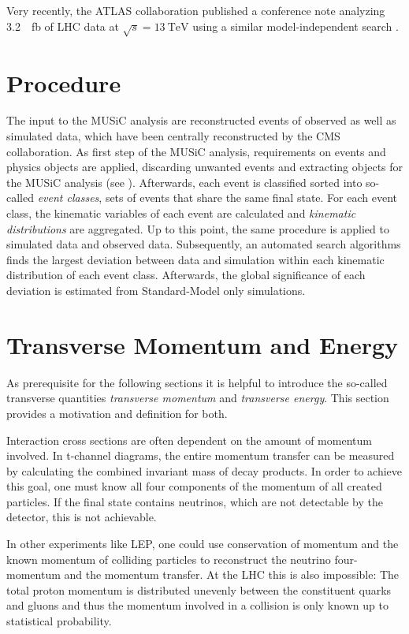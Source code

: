 Very recently, the \ac{ATLAS} collaboration published a conference note analyzing \SI{3.2}{\per\femto\barn} of \ac{LHC} data at $\sqrt{s} = \SI{13}{\TeV}$ using a similar model-independent search \cite{ATLAS:ATLAS-CONF-2017-001}. 

\section{Procedure}
The input to the \ac{MUSiC} analysis are reconstructed events of observed as well as simulated data, which have been centrally reconstructed by the \ac{CMS} collaboration.
As first step of the \ac{MUSiC} analysis, requirements on events and physics objects are applied, discarding unwanted events and extracting objects for the \ac{MUSiC} analysis (see ).
Afterwards, each event is classified sorted into so-called \emph{event classes}, sets of events that share the same final state.
For each event class, the kinematic variables of each event are calculated and \emph{kinematic distributions} are aggregated.
Up to this point, the same procedure is applied to simulated data and observed data.
Subsequently, an automated search algorithms finds the largest deviation between data and simulation within each kinematic distribution of each event class. Afterwards, the global significance of each deviation is estimated from Standard-Model only simulations.

\section{Transverse Momentum and Energy}
\label{sec:transverse_quantities}

As prerequisite for the following sections it is helpful to introduce the so-called transverse quantities \emph{transverse momentum} and \emph{transverse energy}. This section provides a motivation and definition for both.

Interaction cross sections are often dependent on the amount of momentum involved. In t-channel diagrams, the entire momentum transfer can be measured by calculating the combined invariant mass of decay products.
In order to achieve this goal, one must know all four components of the momentum of all created particles. If the final state contains neutrinos, which are not detectable by the detector, this is not achievable.

In other experiments like \ac{LEP}, one could use conservation of momentum and the known momentum of colliding particles to reconstruct the neutrino four-momentum and the momentum transfer. At the \ac{LHC} this is also impossible: The total proton momentum is distributed unevenly between the constituent quarks and gluons and thus the momentum involved in a collision is only known up to statistical probability.

